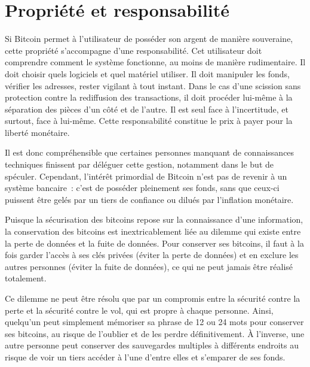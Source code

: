 \section*{Propriété et responsabilité}

Si Bitcoin permet à l'utilisateur de posséder son argent de manière souveraine, cette propriété s'accompagne d'une responsabilité. Cet utilisateur doit comprendre comment le système fonctionne, au moins de manière rudimentaire. Il doit choisir quels logiciels et quel matériel utiliser. Il doit manipuler les fonds, vérifier les adresses, rester vigilant à tout instant. Dans le cas d'une scission sans protection contre la rediffusion des transactions, il doit procéder lui-même à la séparation des pièces d'un côté et de l'autre. Il est seul face à l'incertitude, et surtout, face à lui-même. Cette responsabilité constitue le prix à payer pour la liberté monétaire.

Il est donc compréhensible que certaines personnes manquant de connaissances techniques finissent par déléguer cette gestion, notamment dans le but de spéculer. Cependant, l'intérêt primordial de Bitcoin n'est pas de revenir à un système bancaire~: c'est de posséder pleinement ses fonds, sans que ceux-ci puissent être gelés par un tiers de confiance ou dilués par l'inflation monétaire.

Puisque la sécurisation des bitcoins repose sur la connaissance d'une information, la conservation des bitcoins est inextricablement liée au dilemme qui existe entre la perte de données et la fuite de données. Pour conserver ses bitcoins, il faut à la fois garder l'accès à ses clés privées (éviter la perte de données) et en exclure les autres personnes (éviter la fuite de données), ce qui ne peut jamais être réalisé totalement.

Ce dilemme ne peut être résolu que par un compromis entre la sécurité contre la perte et la sécurité contre le vol, qui est propre à chaque personne. Ainsi, quelqu'un peut simplement mémoriser sa phrase de 12 ou 24 mots pour conserver ses bitcoins, au risque de l'oublier et de les perdre définitivement. À l'inverse, une autre personne peut conserver des sauvegardes multiples à différents endroits au risque de voir un tiers accéder à l'une d'entre elles et s'emparer de ses fonds.

